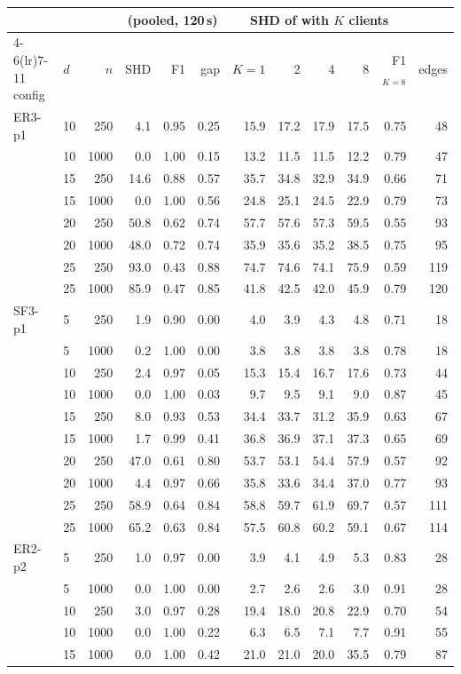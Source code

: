 \begin{tabular}{llr rrr rrrrr r}
\toprule
 & & & \multicolumn{3}{c}{\exdbn{} (pooled, 120\,s)} & \multicolumn{5}{c}{SHD of \feddbn{} with $K$ clients} & \\
\cmidrule(lr){4-6}\cmidrule(lr){7-11}
config & $d$ & $n$ & SHD & F1 & gap & $K{=}1$ & 2 & 4 & 8 & F1$_{K=8}$ & edges \\
\midrule
ER3-p1 & 10 & 250 & 4.1 & 0.95 & 0.25 & 15.9 & 17.2 & 17.9 & 17.5 & 0.75 & 48 \\
 & 10 & 1000 & 0.0 & 1.00 & 0.15 & 13.2 & 11.5 & 11.5 & 12.2 & 0.79 & 47 \\
 & 15 & 250 & 14.6 & 0.88 & 0.57 & 35.7 & 34.8 & 32.9 & 34.9 & 0.66 & 71 \\
 & 15 & 1000 & 0.0 & 1.00 & 0.56 & 24.8 & 25.1 & 24.5 & 22.9 & 0.79 & 73 \\
 & 20 & 250 & 50.8 & 0.62 & 0.74 & 57.7 & 57.6 & 57.3 & 59.5 & 0.55 & 93 \\
 & 20 & 1000 & 48.0 & 0.72 & 0.74 & 35.9 & 35.6 & 35.2 & 38.5 & 0.75 & 95 \\
 & 25 & 250 & 93.0 & 0.43 & 0.88 & 74.7 & 74.6 & 74.1 & 75.9 & 0.59 & 119 \\
 & 25 & 1000 & 85.9 & 0.47 & 0.85 & 41.8 & 42.5 & 42.0 & 45.9 & 0.79 & 120 \\
\midrule
SF3-p1 & 5 & 250 & 1.9 & 0.90 & 0.00 & 4.0 & 3.9 & 4.3 & 4.8 & 0.71 & 18 \\
 & 5 & 1000 & 0.2 & 1.00 & 0.00 & 3.8 & 3.8 & 3.8 & 3.8 & 0.78 & 18 \\
 & 10 & 250 & 2.4 & 0.97 & 0.05 & 15.3 & 15.4 & 16.7 & 17.6 & 0.73 & 44 \\
 & 10 & 1000 & 0.0 & 1.00 & 0.03 & 9.7 & 9.5 & 9.1 & 9.0 & 0.87 & 45 \\
 & 15 & 250 & 8.0 & 0.93 & 0.53 & 34.4 & 33.7 & 31.2 & 35.9 & 0.63 & 67 \\
 & 15 & 1000 & 1.7 & 0.99 & 0.41 & 36.8 & 36.9 & 37.1 & 37.3 & 0.65 & 69 \\
 & 20 & 250 & 47.0 & 0.61 & 0.80 & 53.7 & 53.1 & 54.4 & 57.9 & 0.57 & 92 \\
 & 20 & 1000 & 4.4 & 0.97 & 0.66 & 35.8 & 33.6 & 34.4 & 37.0 & 0.77 & 93 \\
 & 25 & 250 & 58.9 & 0.64 & 0.84 & 58.8 & 59.7 & 61.9 & 69.7 & 0.57 & 111 \\
 & 25 & 1000 & 65.2 & 0.63 & 0.84 & 57.5 & 60.8 & 60.2 & 59.1 & 0.67 & 114 \\
\midrule
ER2-p2 & 5 & 250 & 1.0 & 0.97 & 0.00 & 3.9 & 4.1 & 4.9 & 5.3 & 0.83 & 28 \\
 & 5 & 1000 & 0.0 & 1.00 & 0.00 & 2.7 & 2.6 & 2.6 & 3.0 & 0.91 & 28 \\
 & 10 & 250 & 3.0 & 0.97 & 0.28 & 19.4 & 18.0 & 20.8 & 22.9 & 0.70 & 54 \\
 & 10 & 1000 & 0.0 & 1.00 & 0.22 & 6.3 & 6.5 & 7.1 & 7.7 & 0.91 & 55 \\
 & 15 & 1000 & 0.0 & 1.00 & 0.42 & 21.0 & 21.0 & 20.0 & 35.5 & 0.79 & 87 \\
\bottomrule
\end{tabular}
